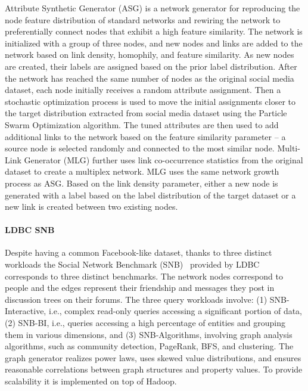 Attribute Synthetic Generator (ASG) is a network generator for reproducing the
node feature distribution of standard networks and rewiring the network to
preferentially connect nodes that exhibit a high feature similarity. The network
is initialized with a group of three nodes, and new nodes and links are added to
the network based on link density, homophily, and feature similarity. As new
nodes are created, their labels are assigned based on the prior label
distribution. After the network has reached the same number of nodes as the
original social media dataset, each node initially receives a random attribute
assignment. Then a stochastic optimization process is used to move the initial
assignments closer to the target distribution extracted from social media
dataset using the Particle Swarm Optimization algorithm. The tuned attributes
are then used to add additional links to the network based on the feature
similarity parameter -- a source node is selected randomly and connected to the
most similar node. Multi-Link Generator (MLG) further  uses link co-occurrence statistics from the
original dataset to create a multiplex network. MLG uses the same network growth
process as ASG. Based on the link density parameter, either a new node is
generated with a label based on the label distribution of the target dataset or
a new link is created between two existing nodes.


\paragraph{LDBC SNB} Despite having a common Facebook-like dataset, thanks to three distinct workloads the Social Network Benchmark (SNB)~\cite{Erling:2015:LSN:2723372.2742786} provided by LDBC corresponds to three distinct benchmarks. The network nodes correspond to people and the edges represent their friendship and messages they post in discussion trees on their forums. The three query workloads involve: (1) SNB-Interactive, i.e., complex read-only queries accessing a significant portion of data, (2) SNB-BI, i.e., queries accessing a high percentage of  entities and grouping them in various dimensions, and (3) SNB-Algorithms, involving graph analysis algorithms, such as community detection, PageRank, BFS, and clustering. The graph generator realizes power laws, uses skewed value distributions, and ensures reasonable correlations between graph structures and property values. To provide scalability it is implemented on top of Hadoop.


